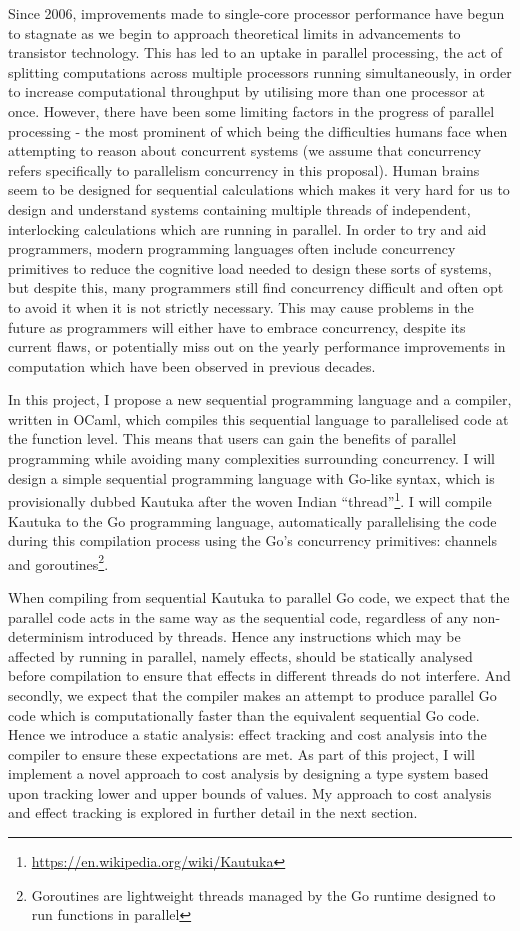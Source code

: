 \documentclass[12pt,a4paper,twoside]{article}
\begin{document}
Since 2006, improvements made to single-core processor performance have begun to stagnate as we begin to approach theoretical limits in advancements to transistor technology. This has led to an uptake in parallel processing, the act of splitting computations across multiple processors running simultaneously, in order to increase computational throughput by utilising more than one processor at once. However, there have been some limiting factors in the progress of parallel processing - the most prominent of which being the difficulties humans face when attempting to reason about concurrent systems (we assume that concurrency refers specifically to parallelism concurrency in this proposal). Human brains seem to be designed for sequential calculations \cite{Sigman7585} which makes it very hard for us to design and understand systems containing multiple threads of independent, interlocking calculations which are running in parallel. In order to try and aid programmers, modern programming languages often include concurrency primitives to reduce the cognitive load needed to design these sorts of systems, but despite this, many programmers still find concurrency difficult and often opt to avoid it when it is not strictly necessary. This may cause problems in the future as programmers will either have to embrace concurrency, despite its current flaws, or potentially miss out on the yearly performance improvements in computation which have been observed in previous decades.

In this project, I propose a new sequential programming language and a compiler, written in OCaml, which compiles this sequential language to parallelised code at the function level. This means that users can gain the benefits of parallel programming while avoiding many complexities surrounding concurrency. I will design a simple sequential programming language with Go-like syntax, which is provisionally dubbed Kautuka after the woven Indian ``thread''\footnote{\url{https://en.wikipedia.org/wiki/Kautuka}}. I will compile Kautuka to the Go programming language, automatically parallelising the code during this compilation process using the Go's concurrency primitives: channels and goroutines\footnote{Goroutines are lightweight threads managed by the Go runtime designed to run functions in parallel}.

When compiling from sequential Kautuka to parallel Go code, we expect that the parallel code acts in the same way as the sequential code, regardless of any non-determinism introduced by threads. Hence any instructions which may be affected by running in parallel, namely effects, should be statically analysed before compilation to ensure that effects in different threads do not interfere. And secondly, we expect that the compiler makes an attempt to produce parallel Go code which is computationally faster than the equivalent sequential Go code. Hence we introduce a static analysis: effect tracking and cost analysis into the compiler to ensure these expectations are met. As part of this project, I will implement a novel approach to cost analysis by designing a type system based upon tracking lower and upper bounds of values. My approach to cost analysis and effect tracking is explored in further detail in the next section.
\end{document}
